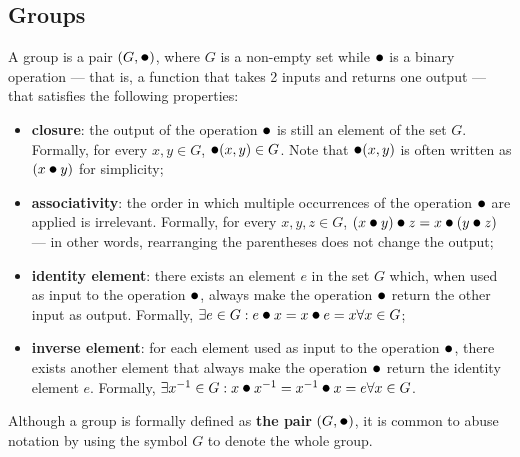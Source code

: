 \subsection{Groups}\label{sec:mathematical_underpinnings:groups}

A group is a pair $(G, \bigcdot)$, where $G$ is a non-empty set while $\bigcdot$ is a binary operation --- that is, a function that takes 2 inputs and returns one output --- that satisfies the following properties:

\begin{itemize}
	\item \textbf{closure}: the output of the operation $\bigcdot$ is still an element of the set $G$. Formally, for every $x, y \in G$, $\bigcdot(x, y) \in G$. Note that $\bigcdot(x, y)$ is often written as $(x \bigcdot y)$ for simplicity;
	\item \textbf{associativity}: the order in which multiple occurrences of the operation $\bigcdot$ are applied is irrelevant. Formally, for every $x, y, z \in G$, $(x \bigcdot y) \bigcdot z = x \bigcdot (y \bigcdot z)$ --- in other words, rearranging the parentheses does not change the output;
	\item \textbf{identity element}: there exists an element $e$ in the set $G$ which, when used as input to the operation $\bigcdot$, always make the operation $\bigcdot$ return the other input as output. Formally, $\exists e \in G : e \bigcdot x = x \bigcdot e = x \forall x \in G$;
	\item \textbf{inverse element}: for each element used as input to the operation $\bigcdot$, there exists another element that always make the operation $\bigcdot$ return the identity element $e$. Formally, $\exists x^{-1} \in G : x \bigcdot x^{-1} = x^{-1} \bigcdot x = e \forall x \in G$.
\end{itemize}

Although a group is formally defined as \textbf{the pair} $(G, \bigcdot)$, it is common to abuse notation by using the symbol $G$ to denote the whole group.



